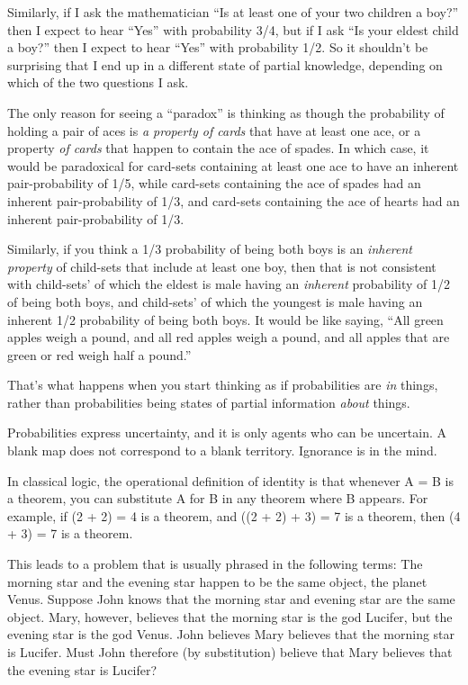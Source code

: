 {
 Similarly, if I ask the mathematician ``Is at
least one of your two children a boy?'' then I expect
to hear ``Yes'' with probability
3/4, but if I ask ``Is your eldest child a
boy?'' then I expect to hear
``Yes'' with probability 1/2. So it
shouldn't be surprising that I end up in a different
state of partial knowledge, depending on which of the two questions I
ask.}

{
 The only reason for seeing a
``paradox'' is thinking as though
the probability of holding a pair of aces is \textit{a property of
cards} that have at least one ace, or a property \textit{of cards} that
happen to contain the ace of spades. In which case, it would be
paradoxical for card-sets containing at least one ace to have an
inherent pair-probability of 1/5, while card-sets containing the ace of
spades had an inherent pair-probability of 1/3, and card-sets
containing the ace of hearts had an inherent pair-probability of 1/3.}

{
 Similarly, if you think a 1/3 probability of being both boys is an
\textit{inherent property} of child-sets that include at least one boy,
then that is not consistent with child-sets' of which
the eldest is male having an \textit{inherent} probability of 1/2 of
being both boys, and child-sets' of which the youngest
is male having an inherent 1/2 probability of being both boys. It would
be like saying, ``All green apples weigh a pound, and
all red apples weigh a pound, and all apples that are green or red
weigh half a pound.''}

{
 That's what happens when you start thinking as if
probabilities are \textit{in} things, rather than probabilities being
states of partial information \textit{about} things.}

{
 Probabilities express uncertainty, and it is only agents who can
be uncertain. A blank map does not correspond to a blank territory.
Ignorance is in the mind.}

\myendsectiontext


{
 In classical logic, the operational definition of identity is that
whenever A = B is a theorem, you can substitute A for B in any theorem
where B appears. For example, if (2 + 2) = 4 is a theorem, and ((2 + 2)
+ 3) = 7 is a theorem, then (4 + 3) = 7 is a theorem. }

{
 This leads to a problem that is usually phrased in the following
terms: The morning star and the evening star happen to be the same
object, the planet Venus. Suppose John knows that the morning star and
evening star are the same object. Mary, however, believes that the
morning star is the god Lucifer, but the evening star is the god Venus.
John believes Mary believes that the morning star is Lucifer. Must John
therefore (by substitution) believe that Mary believes that the evening
star is Lucifer?}

